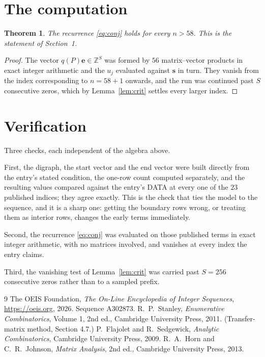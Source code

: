 \documentclass[11pt,a4paper]{article}
\theoremstyle{plain}
\newtheorem{theorem}{Theorem}
\theoremstyle{definition}
\begin{document}
\section{The computation}

\begin{theorem}
The recurrence \eqref{eq:conj} holds for every $n>58$. This is the statement of
Section~1.
\end{theorem}

\begin{proof}
The vector $q(P)\mathbf{e}\in\mathbb{Z}^{S}$ was formed by $56$ matrix--vector
products in exact integer arithmetic and the $u_j$ evaluated against $\mathbf{s}$ in turn.
They vanish from the index corresponding to $n=58+1$ onwards, and the run was continued
past $S$ consecutive zeros, which by Lemma~\ref{lem:crit} settles every larger index.
\end{proof}

\section{Verification}

Three checks, each independent of the algebra above.

First, the digraph, the start vector and the end vector were built directly from the
entry's stated condition, the one-row count computed separately, and the resulting values
compared against the entry's DATA at every one of the $23$ published indices; they
agree exactly. This is the check that ties the model to the sequence, and it is a sharp one:
getting the boundary rows wrong, or treating them as interior rows, changes the early terms
immediately.

Second, the recurrence \eqref{eq:conj} was evaluated on those published terms in exact
integer arithmetic, with no matrices involved, and vanishes at every index the entry claims.

Third, the vanishing test of Lemma~\ref{lem:crit} was carried past $S=256$ consecutive
zeros rather than to a sampled prefix.

\begin{thebibliography}{9}
 The OEIS Foundation, \emph{The On-Line Encyclopedia of Integer
Sequences}, \url{https://oeis.org}, 2026. Sequence A302873.
 R.~P.~Stanley, \emph{Enumerative Combinatorics}, Volume 1, 2nd ed.,
Cambridge University Press, 2011. (Transfer-matrix method, Section 4.7.)
 P.~Flajolet and R.~Sedgewick, \emph{Analytic Combinatorics}, Cambridge
University Press, 2009.
 R.~A.~Horn and C.~R.~Johnson, \emph{Matrix Analysis}, 2nd ed., Cambridge
University Press, 2013.
\end{thebibliography}
\end{document}

